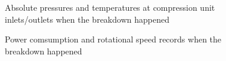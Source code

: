 \begin{figure}[htbp]
  \centering
  \hspace{1em}
  \caption{Absolute pressures and temperatures at compression unit inlets/outlets when the breakdown happened}
  \label{fig:bwp-cp-P-T}
\end{figure}

\begin{figure}[htbp]
  \centering
  \hspace{1em}
  \caption{Power comsumption and rotational speed records when the breakdown happened}
  \label{fig:bwp-cp-P-T}
\end{figure}

\FloatBarrier
